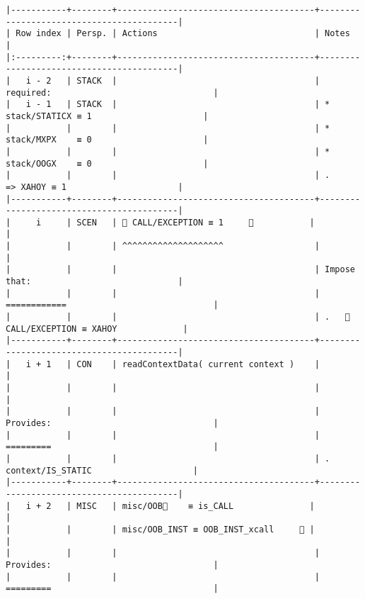 \documentclass[varwidth=\maxdimen,margin=0.5cm,multi={verbatim}]{standalone}
\begin{document}
\begin{verbatim}
|-----------+--------+---------------------------------------+------------------------------------------|
| Row index | Persp. | Actions                               | Notes                                    |
|:---------:+--------+---------------------------------------+------------------------------------------|
|   i - 2   | STACK  |                                       | required:                                |
|   i - 1   | STACK  |                                       | * stack/STATICX ≡ 1                      |
|           |        |                                       | * stack/MXPX    ≡ 0                      |
|           |        |                                       | * stack/OOGX    ≡ 0                      |
|           |        |                                       | .      => XAHOY ≡ 1                      |
|-----------+--------+---------------------------------------+------------------------------------------|
|     i     | SCEN   |  CALL/EXCEPTION ≡ 1     👋           |                                          |
|           |        | ^^^^^^^^^^^^^^^^^^^^                  |                                          |
|           |        |                                       | Impose that:                             |
|           |        |                                       | ============                             |
|           |        |                                       | .    CALL/EXCEPTION ≡ XAHOY             |
|-----------+--------+---------------------------------------+------------------------------------------|
|   i + 1   | CON    | readContextData( current context )    |                                          |
|           |        |                                       |                                          |
|           |        |                                       | Provides:                                |
|           |        |                                       | =========                                |
|           |        |                                       | .   context/IS_STATIC                    |
|-----------+--------+---------------------------------------+------------------------------------------|
|   i + 2   | MISC   | misc/OOB🚩    ≡ is_CALL               |                                          |
|           |        | misc/OOB_INST ≡ OOB_INST_xcall     👋 |                                          |
|           |        |                                       | Provides:                                |
|           |        |                                       | =========                                |

\end{verbatim}
\end{document}
